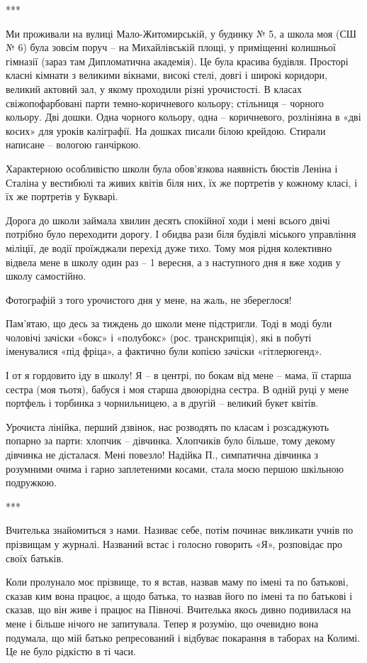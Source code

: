 ***

Ми проживали на вулиці Мало-Житомирській, у будинку № 5, а школа моя (СШ № 6)
була зовсім поруч – на Михайлівській площі, у приміщенні колишньої гімназії
(зараз там Дипломатична академія). Це була красива будівля. Просторі класні
кімнати з великими вікнами, високі стелі, довгі і широкі коридори, великий
актовий зал, у якому проходили різні урочистості. В класах свіжопофарбовані
парти темно-коричневого кольору; стільниця – чорного кольору. Дві дошки. Одна
чорного кольору, одна – коричневого, розлініяна в «дві косих» для уроків
каліграфії. На дошках писали білою крейдою. Стирали написане – вологою
ганчіркою. 

Характерною особливістю школи була обов’язкова наявність бюстів Леніна і
Сталіна у вестибюлі та живих квітів біля них, їх же портретів у кожному класі,
і їх же портретів у Букварі.

Дорога до школи займала хвилин десять спокійної ходи і мені всього двічі
потрібно було переходити дорогу. І обидва рази біля будівлі міського управління
міліції, де водії проїжджали перехід дуже тихо. Тому моя рідня колективно
відвела мене в школу один раз – 1 вересня, а з наступного дня я вже ходив у
школу самостійно.

Фотографій з того урочистого дня у мене, на жаль, не збереглося! 

Пам’ятаю, що десь за тиждень до школи мене підстригли. Тоді в моді були
чоловічі зачіски «бокс» і «полубокс» (рос. транскрипція), які в побуті
іменувалися «під фріца», а фактично були копією зачіски «гітлерюгенд».

І от я гордовито іду в школу! Я – в центрі, по бокам від мене – мама, її старша
сестра (моя тьотя), бабуся і моя старша двоюрідна сестра. В одній руці у мене
портфель і торбинка з чорнильницею, а в другій – великий букет квітів. 

Урочиста лінійка, перший дзвінок, нас розводять по класам і розсаджують попарно
за парти: хлопчик – дівчинка. Хлопчиків було більше, тому декому дівчинка не
дісталася. Мені повезло! Надійка П., симпатична дівчинка з розумними очима і
гарно заплетеними косами, стала моєю першою шкільною подружкою. 

***

Вчителька знайомиться з нами. Називає себе, потім починає викликати учнів по
прізвищам у журналі. Названий встає і голосно говорить «Я», розповідає про
своїх батьків. 

Коли пролунало моє прізвище, то я встав, назвав маму по імені та по батькові,
сказав ким вона працює, а щодо батька, то назвав його по імені та по батькові і
сказав, що він живе і працює на Півночі. Вчителька якось дивно подивилася на
мене і більше нічого не запитувала. Тепер я розумію, що очевидно вона подумала,
що мій батько репресований і відбуває покарання в таборах на Колимі. Це не було
рідкістю в ті часи. 

